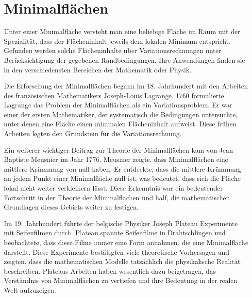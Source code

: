 %
%
%
%
\chapter{Minimalflächen\label{chapter:minimalflaechen}}
\begin{refsection}
	
	
	Unter einer Minimalfläche versteht man eine beliebige Fläche im Raum mit der Spezialität, dass der Flächeninhalt jeweils dem lokalen Minimum entspricht. 
	Gefunden werden solche Flächeninhalte über Variationsrechnungen unter Berücksichtigung der gegebenen Randbedingungen. 
	Ihre Anwendungen finden sie in den verschiedensten Bereichen der Mathematik oder Physik.
	
	Die Erforschung der Minimalflächen begann im 18. Jahrhundert mit den Arbeiten des französischen Mathematikers Joseph-Louis Lagrange. 
	1760 formulierte Lagrange das Problem der Minimalflächen als ein Variationsproblem.
	Er war einer der ersten Mathematiker, der systematisch die Bedingungen untersuchte, unter denen eine Fläche einen minimalen Flächeninhalt aufweist. 
	Diese frühen Arbeiten legten den Grundstein für die Variationsrechnung.
	
	Ein weiterer wichtiger Beitrag zur Theorie der Minimalflächen kam von Jean-Baptiste Meusnier im Jahr 1776. 
	Meusnier zeigte, dass Minimalflächen eine mittlere Krümmung von null haben.
	Er entdeckte, dass die mittlere Krümmung an jedem Punkt einer Minimalfläche null ist, was bedeutet, dass sich die Fläche lokal nicht weiter verkleinern lässt.
	Diese Erkenntnis war ein bedeutender Fortschritt in der Theorie der Minimalflächen und half, die mathematischen Grundlagen dieses Gebiets weiter zu festigen.
	
	Im 19. Jahrhundert führte der belgische Physiker Joseph Plateau Experimente mit Seifenfilmen durch.
	Plateau spannte Seifenfilme in Drahtschlingen und beobachtete, dass diese Filme immer eine Form annahmen, die eine Minimalfläche darstellt.
	Diese Experimente bestätigten viele theoretische Vorhersagen und zeigten, dass die mathematischen Modelle tatsächlich die physikalische Realität beschreiben.
	Plateaus Arbeiten haben wesentlich dazu beigetragen, das Verständnis von Minimalflächen zu vertiefen und ihre Bedeutung in der realen Welt aufzuzeigen.




\printbibliography[heading=subbibliography]
\end{refsection}
